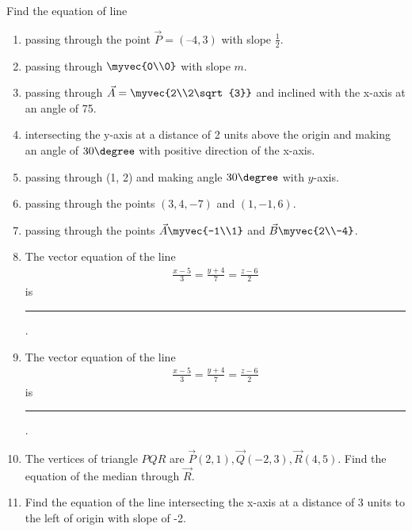 Find the equation of line 
\begin{enumerate}[label=\thesubsection.\arabic*, ref=\thesubsection.\theenumi]
	\item passing through the point $\vec{P} = (– 4,  3)$ with slope $\frac{1}{2}$.
\label{chapters/11/10/2/2}
\\
\solution

	\item passing through $\myvec{0\\0}$ with slope $m$.\\
\label{chapters/11/10/2/3}
\solution

    \item passing through 
    $\vec{A} = \myvec{2\\2\sqrt{3}}$ and inclined with the x-axis at an angle 
    of 75\degree.
\label{chapters/11/10/2/4}
\\
    \solution 

\item intersecting the y-axis at a distance of 2 units above the origin and making an
angle of $30\degree$ with positive direction of the x-axis.
\\
\solution 

\item passing through (1, 2) and making angle $30\degree$ with $y$-axis.
\item passing through the points $(3, 4, -7)$ and $(1, -1, 6)$. 
\item passing through the points $\vec{A}\myvec{-1\\1}$ and $\vec{B}\myvec{2\\-4}$.
\label{chapters/11/10/2/7}
\\
\solution 

\item The vector equation of the line 
\begin{align*}
	\frac{x-5}{3}=\frac{y+4}{7}=\frac{z-6}{2} 
\end{align*}
is \noindent\rule{1cm}{0.1pt}. 
\item The vector equation of the line 
\begin{align*}
	\frac{x-5}{3}=\frac{y+4}{7}=\frac{z-6}{2}
\end{align*}
 is \noindent\rule{1cm}{0.1pt}.
\item 
The vertices of triangle $PQR$ are $\vec{P}(2, 1),  \vec{Q}(-2, 3),  \vec{R}(4, 5)$. Find the equation of the median through $\vec{R}$.
\label{chapters/11/10/2/9}
\\
\solution

\item Find the equation of the line intersecting the x-axis at a distance of 3 units to the left of origin with slope of -2.

\end{enumerate}
